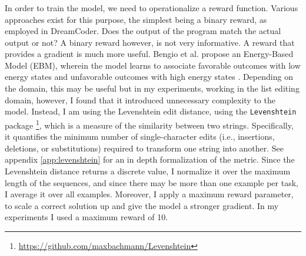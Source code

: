 \subsubsection{}
In order to train the model, we need to operationalize a reward function. Various approaches exist for this purpose, the simplest being a binary reward, as employed in DreamCoder. Does the output of the program match the actual output or not? A binary reward however, is not very informative. A reward that provides a gradient is much more useful. Bengio et al. propose an Energy-Based Model (EBM), wherein the model learns to associate favorable outcomes with low energy states and unfavorable outcomes with high energy states \cite{bengio2023gflownet}. Depending on the domain, this may be useful but in my experiments, working in the list editing domain, however, I found that it introduced unnecessary complexity to the model. Instead, I am using the Levenshtein edit distance, using the \texttt{Levenshtein} package \footnote{\url{https://github.com/maxbachmann/Levenshtein}}, which is a measure of the similarity between two strings. Specifically, it quantifies the minimum number of single-character edits (i.e., insertions, deletions, or substitutions) required to transform one string into another. See appendix \ref{app:levenshtein} for an in depth formalization of the metric.
Since the Levenshtein distance returns a discrete value, I normalize it over the maximum length of the sequences, and since there may be more than one example per task, I average it over all examples. Moreover, I apply a maximum reward parameter, to scale a correct solution up and give the model a stronger gradient. In my experiments I used a maximum reward of 10.















